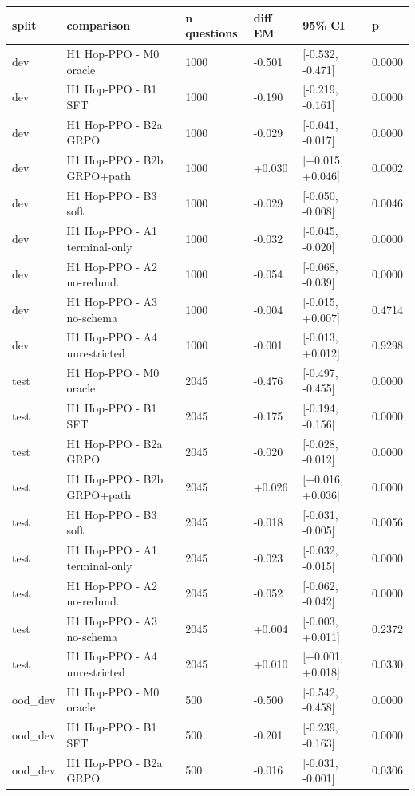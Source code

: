 \begin{tabular}{llllll}
\toprule
split & comparison & n questions & diff EM & 95\% CI & p \\
\midrule
dev & H1 Hop-PPO - M0 oracle & 1000 & -0.501 & [-0.532, -0.471] & 0.0000 \\
dev & H1 Hop-PPO - B1 SFT & 1000 & -0.190 & [-0.219, -0.161] & 0.0000 \\
dev & H1 Hop-PPO - B2a GRPO & 1000 & -0.029 & [-0.041, -0.017] & 0.0000 \\
dev & H1 Hop-PPO - B2b GRPO+path & 1000 & +0.030 & [+0.015, +0.046] & 0.0002 \\
dev & H1 Hop-PPO - B3 soft & 1000 & -0.029 & [-0.050, -0.008] & 0.0046 \\
dev & H1 Hop-PPO - A1 terminal-only & 1000 & -0.032 & [-0.045, -0.020] & 0.0000 \\
dev & H1 Hop-PPO - A2 no-redund. & 1000 & -0.054 & [-0.068, -0.039] & 0.0000 \\
dev & H1 Hop-PPO - A3 no-schema & 1000 & -0.004 & [-0.015, +0.007] & 0.4714 \\
dev & H1 Hop-PPO - A4 unrestricted & 1000 & -0.001 & [-0.013, +0.012] & 0.9298 \\
test & H1 Hop-PPO - M0 oracle & 2045 & -0.476 & [-0.497, -0.455] & 0.0000 \\
test & H1 Hop-PPO - B1 SFT & 2045 & -0.175 & [-0.194, -0.156] & 0.0000 \\
test & H1 Hop-PPO - B2a GRPO & 2045 & -0.020 & [-0.028, -0.012] & 0.0000 \\
test & H1 Hop-PPO - B2b GRPO+path & 2045 & +0.026 & [+0.016, +0.036] & 0.0000 \\
test & H1 Hop-PPO - B3 soft & 2045 & -0.018 & [-0.031, -0.005] & 0.0056 \\
test & H1 Hop-PPO - A1 terminal-only & 2045 & -0.023 & [-0.032, -0.015] & 0.0000 \\
test & H1 Hop-PPO - A2 no-redund. & 2045 & -0.052 & [-0.062, -0.042] & 0.0000 \\
test & H1 Hop-PPO - A3 no-schema & 2045 & +0.004 & [-0.003, +0.011] & 0.2372 \\
test & H1 Hop-PPO - A4 unrestricted & 2045 & +0.010 & [+0.001, +0.018] & 0.0330 \\
ood\_dev & H1 Hop-PPO - M0 oracle & 500 & -0.500 & [-0.542, -0.458] & 0.0000 \\
ood\_dev & H1 Hop-PPO - B1 SFT & 500 & -0.201 & [-0.239, -0.163] & 0.0000 \\
ood\_dev & H1 Hop-PPO - B2a GRPO & 500 & -0.016 & [-0.031, -0.001] & 0.0306 \\

\end{tabular}
